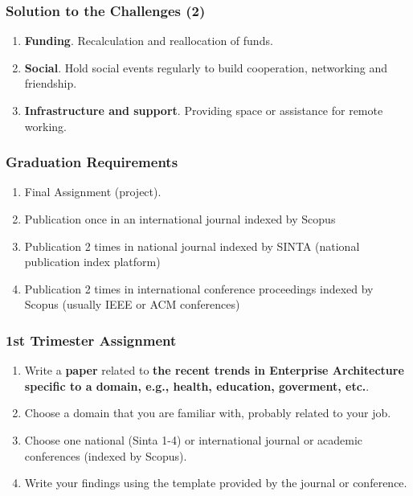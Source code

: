 \documentclass[aspectratio=169, table]{beamer}
\begin{document}
    \begin{frame}
        \frametitle{Solution to the Challenges (2)}
        \begin{enumerate}
            \item \textbf{Funding}. Recalculation and reallocation of funds.
            \item \textbf{Social}. Hold social events regularly to build cooperation, networking and friendship.
            \item \textbf{Infrastructure and support}. Providing space or assistance for remote working.
        \end{enumerate}
    \end{frame}


    \begin{frame}
        \frametitle{Graduation Requirements}
        \begin{enumerate}
            \item Final Assignment (project).
            \item Publication once in an international journal indexed by Scopus
            \item Publication 2 times in national journal indexed by SINTA (national publication index platform)
            \item Publication 2 times in international conference proceedings indexed by Scopus (usually IEEE or ACM conferences)
        \end{enumerate}
    \end{frame}

    \begin{frame}
        \frametitle{1st Trimester Assignment}
        \begin{enumerate}
            \item Write a \textbf{paper} related to \textbf{the recent trends in Enterprise Architecture specific to a domain, e.g., health, education, goverment, etc.}.
            \item Choose a domain that you are familiar with, probably related to your job.
            \item Choose one national (Sinta 1-4) or international journal or academic conferences (indexed by Scopus).
            \item Write your findings using the template provided by the journal or conference.
        \end{enumerate}
    \end{frame}
\end{document}
